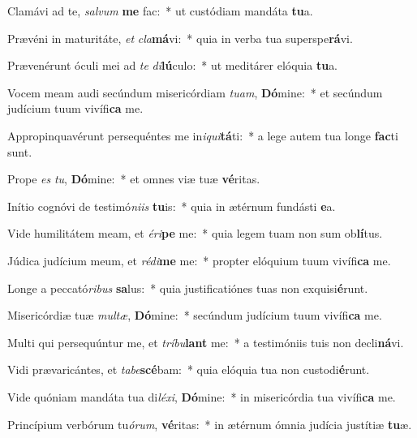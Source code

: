 \item Clamávi ad te, \textit{sal}\textit{vum} \textbf{me} fac:~* ut custódiam mandáta \textbf{tu}a.
\item Prævéni in maturitáte, \textit{et} \textit{cla}\textbf{má}vi:~* quia in verba tua superspe\textbf{rá}vi.
\item Prævenérunt óculi mei ad \textit{te} \textit{di}\textbf{lú}culo:~* ut meditárer elóquia \textbf{tu}a.
\item Vocem meam audi secúndum misericórdiam \textit{tu}\textit{am}, \textbf{Dó}mine:~* et secúndum judícium tuum vivífi\textbf{ca} me.
\item Appropinquavérunt persequéntes me in\textit{i}\textit{qui}\textbf{tá}ti:~* a lege autem tua longe \textbf{fac}ti sunt.
\item Prope \textit{es} \textit{tu}, \textbf{Dó}mine:~* et omnes viæ tuæ \textbf{vé}ritas.
\item Inítio cognóvi de testimó\textit{ni}\textit{is} \textbf{tu}is:~* quia in ætérnum fundásti \textbf{e}a.
\item Vide humilitátem meam, et \textit{é}\textit{ri}\textbf{pe} me:~* quia legem tuam non sum ob\textbf{lí}tus.
\item Júdica judícium meum, et \textit{réd}\textit{i}\textbf{me} me:~* propter elóquium tuum vivífi\textbf{ca} me.
\item Longe a peccató\textit{ri}\textit{bus} \textbf{sa}lus:~* quia justificatiónes tuas non exquisi\textbf{é}runt.
\item Misericórdiæ tuæ \textit{mul}\textit{tæ}, \textbf{Dó}mine:~* secúndum judícium tuum vivífi\textbf{ca} me.
\item Multi qui persequúntur me, et \textit{trí}\textit{bu}\textbf{lant} me:~* a testimóniis tuis non decli\textbf{ná}vi.
\item Vidi prævaricántes, et \textit{ta}\textit{be}\textbf{scé}bam:~* quia elóquia tua non custodi\textbf{é}runt.
\item Vide quóniam mandáta tua di\textit{lé}\textit{xi}, \textbf{Dó}mine:~* in misericórdia tua vivífi\textbf{ca} me.
\item Princípium verbórum tu\textit{ó}\textit{rum}, \textbf{vé}ritas:~* in ætérnum ómnia judícia justítiæ \textbf{tu}æ.
